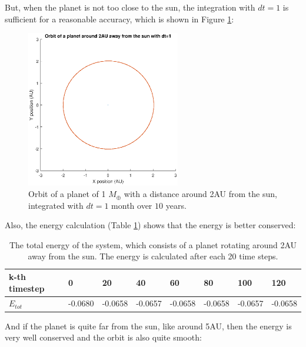 But, when the planet is not too close to the sun, the integration with $dt=1$ is sufficient for a reasonable accuracy, which is shown in Figure \ref{fig:Planet2AUdt1}:

\begin{figure}[H]
\centering
\includegraphics[width=0.6\textwidth]{Planeet_2AU_dt1_10jaar.eps}
\caption{Orbit of a planet of 1 $M_{\oplus}$ with a distance around 2AU from the sun, integrated with $dt=1$ month over $10$ years.}
    \label{fig:Planet2AUdt1}
\end{figure}

Also, the energy calculation (Table \ref{tab:Planet2AUEnergy}) shows that the energy is better conserved:

\begin{table}[htb]
\centering
\caption{The total energy of the system, which consists of a planet rotating around 2AU away from the sun. The energy is calculated after each 20 time steps.}
\begin{tabular}{|l|l|l|l|l|l|l|l|}
\hline
k-th timestep&0&20&40&60&80&100&120\\ \hline
$E_{tot}$&-0.0680&   -0.0658&   -0.0657&   -0.0658&   -0.0658&   -0.0657&   -0.0658\\ \hline
\end{tabular}

\label{tab:Planet2AUEnergy}
\end{table}

And if the planet is quite far from the sun, like around 5AU, then the energy is very well conserved and the orbit is also quite smooth:

